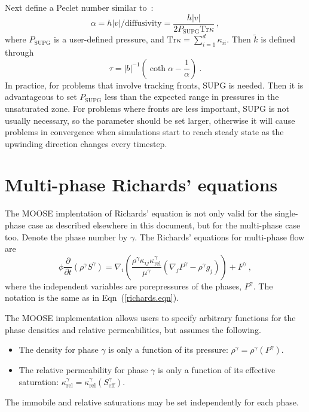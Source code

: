 \documentclass[]{scrreprt}
\begin{document}
Next define a Peclet number similar to~\cite{hughesET1986}:
\begin{equation}
\alpha = h|v|/\mathrm{diffusivity} =
\frac{h|v|}{2P_{\mathrm{SUPG}}\mbox{Tr}\kappa}
\ ,
\end{equation}
where $P_{\mathrm{SUPG}}$ is a user-defined pressure, and
$\mbox{Tr}\kappa = \sum_{i=1}^{d}\kappa_{ii}$.  Then $\tilde{k}$ is
defined through
\begin{equation}
\tau = |b|^{-1} \left( \coth\alpha - \frac{1}{\alpha}\right) \ .
\end{equation}
In practice, for problems that involve tracking fronts, SUPG is
needed.  Then it is advantageous to set $P_{\mathrm{SUPG}}$ less than
the expected range in pressures in the unsaturated zone.  For problems
where fronts are less important, SUPG is not usually necessary, so the
parameter should be set larger, otherwise it will cause problems in
convergence when simulations start to reach steady state as the upwinding direction changes every timestep.



\chapter{Multi-phase Richards' equations}
\label{chap.multi}

The MOOSE implentation of Richards' equation is not only valid for the
single-phase case as described elsewhere in this document, but for the
multi-phase case too.  Denote the phase number by $\gamma$.  The
Richards' equations for multi-phase flow are
\begin{equation}
\phi \frac{\partial}{\partial t} \left( \rho^{\gamma} S^{\gamma} \right) = \nabla_{i}
\left( \frac{\rho^{\gamma} \kappa_{ij}\kappa^{\gamma}_{\mathrm{rel}}}{\mu^{\gamma}} (\nabla_{j}P^{\gamma} - \rho^{\gamma}
g_{j}) \right) 
+ F^{\gamma} \ ,
\label{richards.eqn.multi}
\end{equation}
where the independent variables are porepressures of the phases, $P^{\gamma}$.
The notation is the same as in Eqn~(\ref{richards.eqn}).

The MOOSE
implementation allows users to specify arbitrary functions for the
phase densities and relative permeabilities, but assumes the following.
\begin{itemize}
\item The density for phase $\gamma$ is only a function of its
  pressure: $\rho^{\gamma} = \rho^{\gamma}(P^{\gamma})$.
\item The relative permeability for phase $\gamma$ is only a function
  of its effective saturation: $\kappa^{\gamma}_{\mathrm{rel}} =
  \kappa^{\gamma}_{\mathrm{rel}}(S^{\gamma}_{\mathrm{eff}})$.
\end{itemize}
The immobile and relative saturations may be set independently for
each phase.
\end{document}
